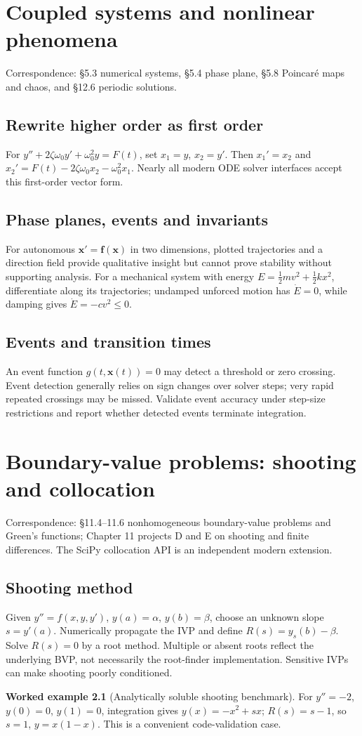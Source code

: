 \documentclass[11pt,letterpaper,oneside]{report}
\theoremstyle{definition}\newtheorem{definition}[theorem]{Definition}
\newtheorem{example}[theorem]{Worked example}
\theoremstyle{remark}\newtheorem{remark}[theorem]{Remark}
\begin{document}
\chapter{Coupled systems and nonlinear phenomena}
\begin{bookground}Correspondence: \S5.3 numerical systems, \S5.4 phase plane, \S5.8 Poincar\'e maps and chaos, and \S12.6 periodic solutions.\end{bookground}
\section{Rewrite higher order as first order}
For $y''+2\zeta\omega_0 y'+\omega_0^2 y=F(t)$, set $x_1=y$, $x_2=y'$. Then $x_1'=x_2$ and $x_2'=F(t)-2\zeta\omega_0x_2-\omega_0^2x_1$. Nearly all modern ODE solver interfaces accept this first-order vector form.
\section{Phase planes, events and invariants}
For autonomous $\mathbf x'=\mathbf f(\mathbf x)$ in two dimensions, plotted trajectories and a direction field provide qualitative insight but cannot prove stability without supporting analysis. For a mechanical system with energy $E=\tfrac12m v^2+\tfrac12 k x^2$, differentiate along its trajectories; undamped unforced motion has $\dot E=0$, while damping gives $\dot E=-cv^2\le0$.
\section{Events and transition times}
An event function $g(t,\mathbf x(t))=0$ may detect a threshold or zero crossing. Event detection generally relies on sign changes over solver steps; very rapid repeated crossings may be missed. Validate event accuracy under step-size restrictions and report whether detected events terminate integration.
\chapter{Boundary-value problems: shooting and collocation}
\begin{bookground}Correspondence: \S11.4--11.6 nonhomogeneous boundary-value problems and Green's functions; Chapter 11 projects D and E on shooting and finite differences. The SciPy collocation API is an independent modern extension.\end{bookground}
\section{Shooting method}
Given $y''=f(x,y,y')$, $y(a)=\alpha$, $y(b)=\beta$, choose an unknown slope $s=y'(a)$. Numerically propagate the IVP and define $R(s)=y_s(b)-\beta$. Solve $R(s)=0$ by a root method. Multiple or absent roots reflect the underlying BVP, not necessarily the root-finder implementation. Sensitive IVPs can make shooting poorly conditioned.
\begin{example}[Analytically soluble shooting benchmark]
For $y''=-2$, $y(0)=0$, $y(1)=0$, integration gives $y(x)=-x^2+s x$; $R(s)=s-1$, so $s=1$, $y=x(1-x)$. This is a convenient code-validation case.
\end{example}
\end{document}
